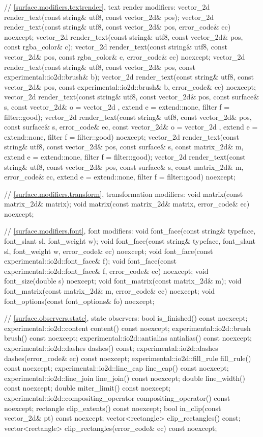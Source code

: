\begin{codeblock}
{{{{{    // \ref{surface.modifiers.textrender}, text render modifiers:
    vector_2d render_text(const string& utf8, const vector_2d& pos);
    vector_2d render_text(const string& utf8, const vector_2d& pos,
      error_code& ec) noexcept;
    vector_2d render_text(const string& utf8, const vector_2d& pos,
      const rgba_color& c);
    vector_2d render_text(const string& utf8, const vector_2d& pos,
      const rgba_color& c, error_code& ec) noexcept;
    vector_2d render_text(const string& utf8, const vector_2d& pos,
      const experimental::io2d::brush& b);
    vector_2d render_text(const string& utf8, const vector_2d& pos,
      const experimental::io2d::brush& b, error_code& ec) noexcept;
    vector_2d render_text(const string& utf8, const vector_2d& pos,
      const surface& s, const vector_2d& o = vector_2d{ },
      extend e = extend::none, filter f = filter::good);
    vector_2d render_text(const string& utf8, const vector_2d& pos,
      const surface& s, error_code& ec, const vector_2d& o = vector_2d{ },
      extend e = extend::none, filter f = filter::good) noexcept;
    vector_2d render_text(const string& utf8, const vector_2d& pos,
      const surface& s, const matrix_2d& m, extend e = extend::none,
      filter f = filter::good);
    vector_2d render_text(const string& utf8, const vector_2d& pos,
      const surface& s, const matrix_2d& m, error_code& ec,
      extend e = extend::none, filter f = filter::good) noexcept;
    
    // \ref{surface.modifiers.transform}, transformation modifiers:
    void matrix(const matrix_2d& matrix);
    void matrix(const matrix_2d& matrix, error_code& ec) noexcept;
    
    // \ref{surface.modifiers.font}, font modifiers:
    void font_face(const string& typeface, font_slant sl, font_weight w);
    void font_face(const string& typeface, font_slant sl, font_weight w,
      error_code& ec) noexcept;
    void font_face(const experimental::io2d::font_face& f);
    void font_face(const experimental::io2d::font_face& f, error_code& ec)
      noexcept;
    void font_size(double s) noexcept;
    void font_matrix(const matrix_2d& m);
    void font_matrix(const matrix_2d& m, error_code& ec) noexcept;
    void font_options(const font_options& fo) noexcept;
    
    // \ref{surface.observers.state}, state observers:
    bool is_finished() const noexcept;
    experimental::io2d::content content() const noexcept;
    experimental::io2d::brush brush() const noexcept;
    experimental::io2d::antialias antialias() const noexcept;
    experimental::io2d::dashes dashes() const;
    experimental::io2d::dashes dashes(error_code& ec) const noexcept;
    experimental::io2d::fill_rule fill_rule() const noexcept;
    experimental::io2d::line_cap line_cap() const noexcept;
    experimental::io2d::line_join line_join() const noexcept;
    double line_width() const noexcept;
    double miter_limit() const noexcept;
    experimental::io2d::compositing_operator compositing_operator() const
      noexcept;
    rectangle clip_extents() const noexcept;
    bool in_clip(const vector_2d& pt) const noexcept;
    vector<rectangle> clip_rectangles() const;
    vector<rectangle> clip_rectangles(error_code& ec) const noexcept;
    
}}}}}
\end{codeblock}
